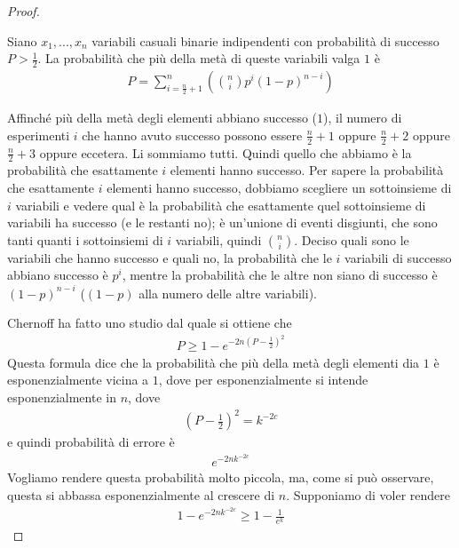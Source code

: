 \begin{proof}
\begin{definition}
Siano $x_1, ..., x_n$ variabili casuali binarie indipendenti con probabilità di successo $P > \frac{1}{2}$. La probabilità che più della metà di queste variabili valga $1$ è
\begin{align*}
    P = \sum^n_{i = \frac{n}{2}+1}\left(\binom{n}{i}p^i(1-p)^{n-i} \right)
\end{align*}
\end{definition}

Affinché più della metà degli elementi abbiano successo ($1$), il numero di esperimenti $i$ che hanno avuto successo possono essere $\frac{n}{2}+1$ oppure $\frac{n}{2}+2$ oppure $\frac{n}{2}+3$ oppure eccetera. Li sommiamo tutti. Quindi quello che abbiamo è la probabilità che esattamente $i$ elementi hanno successo. Per sapere la probabilità che esattamente $i$ elementi hanno successo, dobbiamo scegliere un sottoinsieme di $i$ variabili e vedere qual è la probabilità che esattamente quel sottoinsieme di variabili ha successo (e le restanti no); è un'unione di eventi disgiunti, che sono tanti quanti i sottoinsiemi di $i$ variabili, quindi $\binom{n}{i}$. Deciso quali sono le variabili che hanno successo e quali no, la probabilità che le $i$ variabili di successo abbiano successo è $p^i$, mentre la probabilità che le altre non siano di successo è $(1-p)^{n-i}$ ($(1-p)$ alla numero delle altre variabili).

Chernoff ha fatto uno studio dal quale si ottiene che 
\begin{align*}
    P \ge 1 - e^{-2n \left( P - \frac{1}{2} \right)^2}
\end{align*}
\noindent Questa formula dice che la probabilità che più della metà degli elementi dia $1$ è 
esponenzialmente vicina a $1$, dove per esponenzialmente si intende esponenzialmente in $n$, dove
\begin{align*}
    \left( P - \frac{1}{2} \right)^2 = k^{-2c}
\end{align*}
\noindent e quindi probabilità di errore è 
\begin{align*}
    e^{-2nk^{-2c}}
\end{align*}
\noindent Vogliamo rendere questa probabilità molto piccola, ma, come si può osservare, questa si abbassa esponenzialmente al crescere di $n$. Supponiamo di voler rendere
\begin{align*}
    1-e^{-2nk^{-2c}} \ge 1-\frac{1}{e^k}
\end{align*}


\end{proof}
